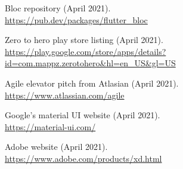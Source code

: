 \documentclass{article}
\begin{document}
\begin{multicols}{2}
\begin{thebibliography}{9}
  Bloc repository (April 2021).\\
  \url{https://pub.dev/packages/flutter\_bloc}

  Zero to hero play store listing (April 2021).\\
  \url{https://play.google.com/store/apps/details?id=com.mappz.zerotohero&hl=en_US&gl=US}

  Agile elevator pitch from Atlasian (April 2021).\\
  \url{https://www.atlassian.com/agile}

  Google's material UI website (April 2021).\\
  \url{https://material-ui.com/}
  
  Adobe website (April 2021).\\
  \url{https://www.adobe.com/products/xd.html}
\end{thebibliography}


\newpage
\end{multicols}
\end{document}
